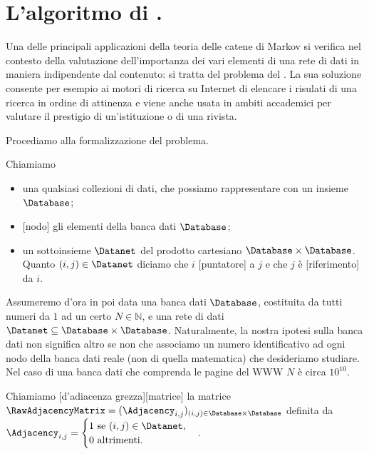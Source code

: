 \section{L'algoritmo di \PageRank.}\label{PageRank}
\par Una delle principali applicazioni della teoria delle catene di Markov si verifica nel contesto della valutazione dell'importanza dei vari elementi di una rete di dati in maniera indipendente dal contenuto: si tratta del problema del \Define{\PageRank}. La sua soluzione consente per esempio ai motori di ricerca su Internet di elencare i risulati di una ricerca in ordine di attinenza e viene anche usata in ambiti accademici per valutare il prestigio di un'istituzione o di una rivista.
\par Procediamo alla formalizzazione del problema.
\begin{Definition}
	Chiamiamo
	\begin{itemize}
		\item {} una qualsiasi collezioni di dati, che possiamo rappresentare con un insieme $\Database$;
		\item {} gli elementi della banca dati $\Database$;
		\item {} un sottoinsieme $\Datanet$ del prodotto cartesiano $\Database \times \Database$. Quanto $(i,j) \in \Datanet$ diciamo che $i$ [puntatore] a $j$ e che $j$ \`e [riferimento] da $i$.
	\end{itemize}
\end{Definition}
\par Assumeremo d'ora in poi data una banca dati $\Database$, costituita da tutti numeri da $1$ ad un certo $N \in \mathbb{N}$, e una rete di dati $\Datanet \subseteq \Database \times \Database$. Naturalmente, la nostra ipotesi sulla banca dati non significa altro se non che associamo un numero identificativo ad ogni nodo della banca dati reale (non di quella matematica) che desideriamo studiare. Nel caso di una banca dati che comprenda le pagine del WWW $N$ \`e circa $10^{10}$.
\begin{Definition}
	Chiamiamo [d'adiacenza grezza][matrice] la matrice $\RawAdjacencyMatrix = (\Adjacency_{i,j})_{(i,j) \in \Database \times \Database}$ definita da $\Adjacency_{i,j} = \begin{cases} 1\text{ se }(i,j) \in \Datanet,\\0\text{ altrimenti}.\end{cases}$.
\end{Definition}
